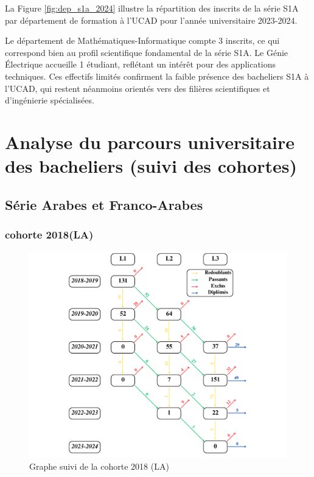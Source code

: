 \newpage
La Figure \ref{fig:dep_s1a_2024} illustre la répartition des inscrits de la série S1A par département de formation à l'UCAD pour l'année universitaire 2023-2024.

Le département de Mathématiques-Informatique compte 3 inscrits, ce qui correspond bien au profil scientifique fondamental de la série S1A. Le Génie Électrique accueille 1 étudiant, reflétant un intérêt pour des applications techniques. 
Ces effectifs limités confirment la faible présence des bacheliers S1A à l’UCAD, qui restent néanmoins orientés vers des filières scientifiques et d’ingénierie spécialisées.

\newpage
\section{Analyse du parcours universitaire des bacheliers (suivi des cohortes)}

\subsection{Série Arabes et Franco-Arabes}
\subsubsection{cohorte 2018(LA)}

\begin{figure}[ht]
    \centering
    \caption{Graphe suivi de la cohorte 2018 (LA)}
    \includegraphics[width=1\textwidth]{figure/LA_2018.png}
\end{figure}

